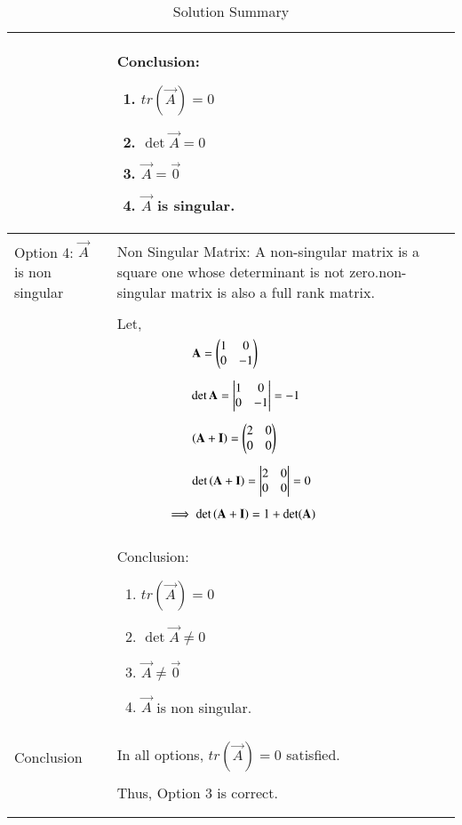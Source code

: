 \documentclass[journal,12pt]{IEEEtran}
\begin{document}
\begin{longtable}{|p{5cm}|p{13cm}|}
    & Conclusion: {\begin{enumerate}
	\item $tr(\vec{A})=0$
	\item $\det{\vec{A}}=0$
	\item $\vec{A}=\vec{0}$
	\item $\vec{A}$ is singular.\end{enumerate}}\\
    \hline
	\multirow{3}{*}{Option 4: $\vec{A}$ is non singular}&\\
  	& Non Singular Matrix:
A non-singular matrix is a square one whose determinant is not zero.non-singular matrix is also  a full rank matrix.\\
&\\
	& Let,\\
	& $\qquad\qquad\qquad\mathbf{A}=\begin{pmatrix}1&0\\0&-1\end{pmatrix}$\\
	&\\
	& $\qquad\qquad\qquad\det{\mathbf{A}} = \begin{vmatrix}1&0\\0&-1\end{vmatrix} = -1$\\
	&\\
	& $\qquad\qquad\qquad\left(\mathbf{A}+\mathbf{I}\right)=\begin{pmatrix}2&0\\0&0\end{pmatrix}$\\
	&\\
	& $\qquad\qquad\qquad\det\left(\mathbf{A}+\mathbf{I}\right)=\begin{vmatrix}2&0\\0&0\end{vmatrix}=0$\\
	&\\
	& $\qquad\qquad\implies\det\left(\mathbf{A}+\mathbf{I}\right)=1+\det(\mathbf{A})$\\
	&\\
	& Conclusion: {\begin{enumerate}
	\item $tr(\vec{A})=0$
	\item $\det{\vec{A}}\neq0$
	\item $\vec{A} \neq \vec{0}$
	\item $\vec{A}$ is non singular.\end{enumerate}}\\
	\hline
	\multirow{3}{*}{Conclusion}&\\
& In all options, $tr(\vec{A})=0$ satisfied.\\
&\\
& Thus, Option 3 is correct. \\
&\\

	\hline
	\caption{Solution Summary}
    \label{table:2}
\end{longtable}
\end{document}
